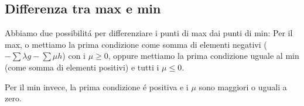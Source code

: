 \documentclass[12pt, a4paper, openany]{book}
\begin{document}
\subsection{Differenza tra max e min}
Abbiamo due possibilitá per differenziare i punti di max dai punti di min:
Per il max, o mettiamo la prima condizione come somma di elementi negativi ($-\sum \lambda g -\sum \mu h$) con i $\mu \geq 0$, 
oppure mettiamo la prima condizione uguale al min (come somma di elementi positivi) e tutti i $\mu \leq 0$.

Per il min invece, la prima condizione é positiva e i $\mu$ sono maggiori o uguali a zero.
\end{document}
